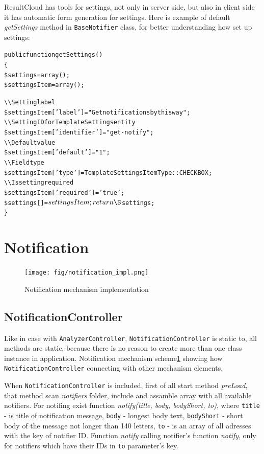 ResultCloud has tools for settings, not only in server side, but also in client side it has automatic form generation for settings. Here is example of default \emph{getSettings} method in \texttt{BaseNotifier} class, for better understanding how set up settings:

\begin{alltt}
public function getSettings()
\{
    \$settings = array();
    \$settingsItem = array();

    \textbackslash\textbackslash Setting label
    \$settingsItem['label'] = "Get notifications by this way";
    \textbackslash\textbackslash Setting ID for TemplateSettings entity
    \$settingsItem['identifier'] = "get-notify";
    \textbackslash\textbackslash Default value
    \$settingsItem['default'] = "1";
    \textbackslash\textbackslash Field type
    \$settingsItem['type'] = TemplateSettingsItemType::CHECKBOX;
    \textbackslash\textbackslash Is setting required
    \$settingsItem['required'] = 'true';
    \$settings[] = $settingsItem;

    return \S$settings; 
\}
\end{alltt}

\section{Notification}

\begin{figure}[hb]
  \centering
    \texttt{[image: fig/notification\_impl.png]}
  \caption{Notification mechanism implementation}
  \label{fig:not_impl}
\end{figure}

\subsection{NotificationController}

Like in case with \texttt{AnalyzerController}, \texttt{NotificationController} is static to, all methods are static, because there is no reason to create more than one class instance in application. Notification mechanism scheme\ref{fig:not_impl} showing how \texttt{NotificationController} connecting with other mechanism elements.

When \texttt{NotificationController} is included, first of all start method \emph{preLoad}, that method scan \emph{notifiers} folder, include and assamble array with all available notifiers. For notifing exist function \emph{notify(title, body, bodyShort, to)}, where \texttt{title} - is title of notification message, \texttt{body} - longest body text, \texttt{bodyShort} - short body of the message not longer than 140 letters, \texttt{to} - is an array of all adresses with the key of notifier ID. Function \emph{notify} calling notifier's function \emph{notify}, only for notifiers which have their IDs in \texttt{to} parameter's key.

